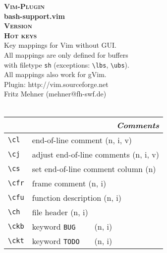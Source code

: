 \documentclass[oneside,12pt,a4paper,DIV18]{scrartcl}
\begin{document}
\begin{center}
\textbf{\textsc{\small{Vim-Plugin}}}\\
\textbf{\huge{bash-support.vim}}\\
\textbf{\textsc{\small{Version \PluginVersion}}}\\
\vspace{5mm}%
\textbf{\textsc{\LARGE{Hot keys}}}\\ 
\vspace{5mm}%
\footnotesize{Key mappings for Vim without GUI.}\\
\vspace{1mm}%
\footnotesize{
All mappings are only defined for buffers\\
with filetype \texttt{sh} (exceptions: \verb'\lbs',  \verb'\ubs').\\
All mappings also work for gVim.}\\ 
\vspace{1mm}%
\footnotesize{Plugin: http://vim.sourceforge.net}\\
\footnotesize{Fritz Mehner (mehner@fh-swf.de)}\\
\footnotesize{\ReleaseDate}\\
\vspace{3.5mm}
\small
\begin{tabular}[]{|p{11mm}|p{59mm}|}
\hline
\multicolumn{2}{|r|}{\textsl{\textbf{C}omments}}\\
\hline \verb'\cl'  & end-of-line comment              \hfill (n, i, v)\\
\hline \verb'\cj'  & adjust end-of-line comments      \hfill (n, i, v)\\
\hline \verb'\cs'  & set end-of-line comment column   \hfill (n)\\
\hline \verb'\cfr' & frame comment                    \hfill (n, i)\\
\hline \verb'\cfu' & function description             \hfill (n, i)\\
\hline \verb'\ch'  & file header                      \hfill (n, i)\\
\hline \verb'\ckb' & keyword \verb'BUG    '           \hfill (n, i)\\
\hline \verb'\ckt' & keyword \verb'TODO   '           \hfill (n, i)\\

\end{tabular}
\end{center}
\end{document}
